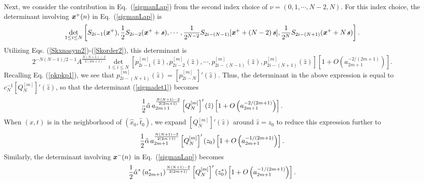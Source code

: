 \documentclass[amsmath,amssymb]{revtex4}
\def\[{\begin{equation}}
\def\]{\end{equation}}
\begin{document}
Next, we consider the contribution in Eq.~(\ref{sigmanLap}) from the second index choice of $\nu=(0, 1, \cdots, N-2, N)$. For this index choice, the determinant involving $\textbf{\emph{x}}^{+}(n)$ in Eq.~(\ref{sigmanLap}) is
\[ \label{sigmadet1}
\det_{1 \leq i \leq N} \left[S_{2i-1}(\textbf{\emph{x}}^{+}), \frac{1}{2}S_{2i-2}(\textbf{\emph{x}}^{+} + \textbf{\emph{s}}), \cdots, \frac{1}{2^{N-2}}S_{2i-(N-1)}[\textbf{\emph{x}}^{+} +(N-2) \hspace{0.06cm} \textbf{\emph{s}}], \frac{1}{2^{N}}S_{2i-(N+1)}(\textbf{\emph{x}}^{+} +N \hspace{0.04cm}\textbf{\emph{s}})\right].
\]
Utilizing Eqs. (\ref{Skxnasym2})-(\ref{Skorder2}), this determinant is
\[
2^{-N(N-1)/2-1}A^{\frac{N(N+1)-2}{2(2m+1)}}
\det_{1 \leq i \leq N} \left[p^{[m]}_{2i-1}(\hat{z}),  p^{[m]}_{2i-2}(\hat{z}),
\cdots, p^{[m]}_{2i-(N-1)}(\hat{z}),  p^{[m]}_{2i-(N+1)}(\hat{z})\right]\left[1+O\left(a_{2m+1}^{-2/(2m+1)}\right)\right].
\]
Recalling Eq. (\ref{pkpkp1}), we see that $p^{[m]}_{2i-(N+1)}(\hat{z})=[p^{[m]}_{2i-N}]'(\hat{z})$. Thus, the determinant in the above expression is equal to $c_N^{-1}\left[Q_{N}^{[m]}\right]'(\hat{z})$, so that the determinant (\ref{sigmadet1}) becomes
\[ \label{Phinnxtnew2}
\frac{1}{2}\hat{\alpha} \hspace{0.06cm} a_{2m+1}^{\frac{N(N+1)-2}{2(2m+1)}}\left[Q_{N}^{[m]}\right]'(\hat{z}) \left[1+O\left(a_{2m+1}^{-2/(2m+1)}\right)\right].
\]
When $(x, t)$ is in the neighborhood of $(\hat{x}_{0}, \hat{t}_{0})$, we expand $\left[Q_{N}^{[m]}\right]'(\hat{z})$ around $\hat{z}=z_0$ to reduce this expression further to
\[
\frac{1}{2}\hat{\alpha} \hspace{0.06cm} a_{2m+1}^{\frac{N(N+1)-2}{2(2m+1)}}\left[Q_{N}^{[m]}\right]'(z_0) \left[1+O\left(a_{2m+1}^{-1/(2m+1)}\right)\right].
\]
Similarly, the determinant involving $\textbf{\emph{x}}^{-}(n)$ in Eq.~(\ref{sigmanLap}) becomes
\[
\frac{1}{2}\hat{\alpha}^* \hspace{0.06cm} (a_{2m+1}^*)^{\frac{N(N+1)-2}{2(2m+1)}}\left[Q_{N}^{[m]}\right]'(z_0^*) \left[1+O\left(a_{2m+1}^{-1/(2m+1)}\right)\right].
\]
\end{document}

